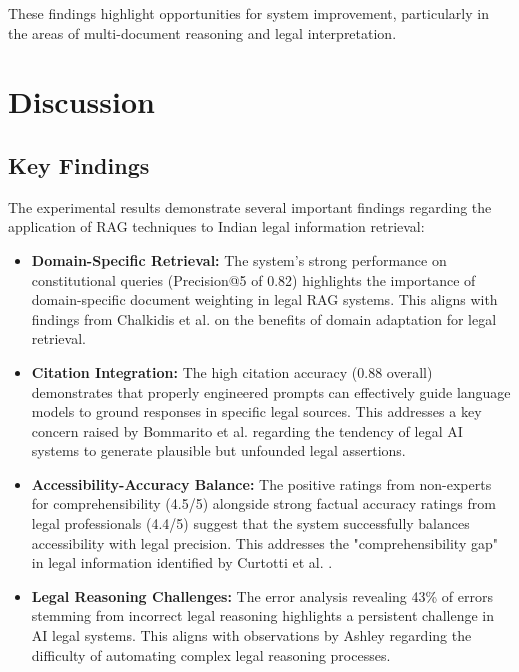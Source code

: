 \documentclass[conference]{IEEEtran}
\begin{document}
These findings highlight opportunities for system improvement, particularly in the areas of multi-document reasoning and legal interpretation.

\section{Discussion}

\subsection{Key Findings}

The experimental results demonstrate several important findings regarding the application of RAG techniques to Indian legal information retrieval:

\begin{itemize}
    \item \textbf{Domain-Specific Retrieval:} The system's strong performance on constitutional queries (Precision@5 of 0.82) highlights the importance of domain-specific document weighting in legal RAG systems. This aligns with findings from Chalkidis et al. \cite{chalkidis2022} on the benefits of domain adaptation for legal retrieval.
    
    \item \textbf{Citation Integration:} The high citation accuracy (0.88 overall) demonstrates that properly engineered prompts can effectively guide language models to ground responses in specific legal sources. This addresses a key concern raised by Bommarito et al. \cite{bommarito2022} regarding the tendency of legal AI systems to generate plausible but unfounded legal assertions.
    
    \item \textbf{Accessibility-Accuracy Balance:} The positive ratings from non-experts for comprehensibility (4.5/5) alongside strong factual accuracy ratings from legal professionals (4.4/5) suggest that the system successfully balances accessibility with legal precision. This addresses the "comprehensibility gap" in legal information identified by Curtotti et al. \cite{curtotti2015}.
    
    \item \textbf{Legal Reasoning Challenges:} The error analysis revealing 43\% of errors stemming from incorrect legal reasoning highlights a persistent challenge in AI legal systems. This aligns with observations by Ashley \cite{ashley2017} regarding the difficulty of automating complex legal reasoning processes.
\end{itemize}
\end{document}
